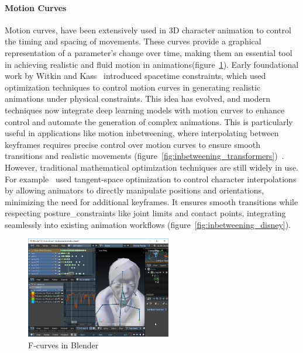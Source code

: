 \documentclass[../../main.tex]{subfiles}
\begin{document}
\paragraph{Motion Curves}
\label{ch:background_work:sign_language_synthesis:3d_techniques:avatar_animation:motion_curves}

Motion curves, have been extensively used in 3D character animation to control the timing and spacing of movements. These curves provide a graphical representation of a parameter's change over time, making them an essential tool in achieving realistic and fluid motion in animations(figure~\ref{fig:fcurves_blender}). Early foundational work by Witkin and Kass~\cite{witkin1988spacetime} introduced spacetime constraints, which used optimization techniques to control motion curves in generating realistic animations under physical constraints. This idea has evolved, and modern techniques now integrate deep learning models with motion curves to enhance control and automate the generation of complex animations. This is particularly useful in applications like motion inbetweening, where interpolating between keyframes requires precise control over motion curves to ensure smooth transitions and realistic movements (figure~\ref{fig:inbetweening_transformers})~\cite{10.1145/3550454.3555454}. However, traditional mathematical optimization techniques are still widely in use. For example~\cite{10.1145/3306346.3322938} used tangent-space optimization to control character interpolations by allowing animators to directly manipulate positions and orientations, minimizing the need for additional keyframes. It ensures smooth transitions while respecting \gls{posture_constraint}s like joint limits and contact points, integrating seamlessly into existing animation workflows (figure~\ref{fig:inbetweening_disney}). 

\begin{figure}
    \centering \includegraphics[width = 2.5in]{chapters/intermediate_blocks/images/fcurves_blender.png}
    \caption{F-curves in Blender}
    \label{fig:fcurves_blender}
\end{figure}
\end{document}
